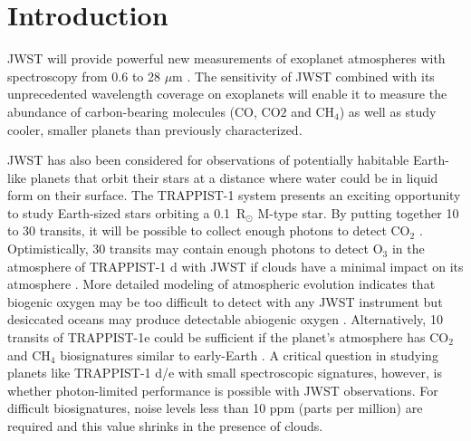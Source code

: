 \documentclass[]{aastex62}
\begin{document}

\section{Introduction} \label{sec:intro}

JWST will provide powerful new measurements of exoplanet atmospheres with spectroscopy from 0.6 to 28 $\mu$m
\citep{beichman2014pasp,greene2016jwst_trans,howe2017informationJWST,barstow2015jwstSystematics,schlawin2018JWSTforecasts}.
The sensitivity of JWST combined with its unprecedented wavelength coverage on exoplanets will enable it to measure the abundance of carbon-bearing molecules (CO, CO$2$ and CH$_4$) as well as study cooler, smaller planets than previously characterized.

JWST has also been considered for observations of potentially habitable Earth-like planets that orbit their stars at a distance where water could be in liquid form on their surface.
The TRAPPIST-1 system \citep{gillon2016trappist1Discovery,gillon2017trappist-1sevenp} presents an exciting opportunity to study Earth-sized stars orbiting a 0.1~R$_\odot$ M-type star.
By putting together 10 to 30 transits, it will be possible to collect enough photons to detect CO$_2$ \citep{barstow2016trappist1habitable,krissansen-totton2018trappist1eJWST,lustig-yaeger2019detectabilityTRAPPIST-1}.
Optimistically, 30 transits may contain enough photons to detect O$_3$ in the atmosphere of TRAPPIST-1 d with JWST if clouds have a minimal impact on its atmosphere \citep{barstow2016trappist1habitable}.
More detailed modeling of atmospheric evolution indicates that biogenic oxygen may be too difficult to detect with any JWST instrument but desiccated oceans may produce detectable abiogenic oxygen \citep{lustig-yaeger2019detectabilityTRAPPIST-1}.
Alternatively, 10 transits of TRAPPIST-1e could be sufficient if the planet's atmosphere has CO$_2$ and CH$_4$ biosignatures similar to early-Earth \citep{krissansen-totton2018trappist1eJWST}.
A critical question in studying planets like TRAPPIST-1 d/e with small spectroscopic signatures, however, is whether photon-limited performance is possible with JWST observations.
For difficult biosignatures, noise levels less than 10 ppm (parts per million) are required and this value shrinks in the presence of clouds.
\end{document}
